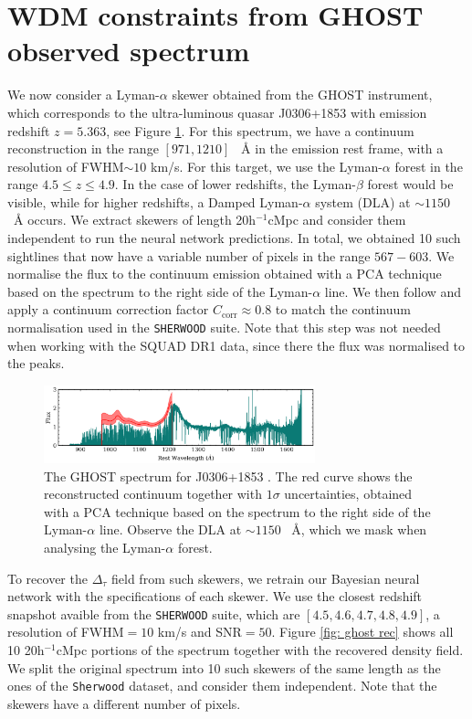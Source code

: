 \section{WDM constraints from GHOST observed spectrum}\label{sec:inference ghost}
We now consider a Lyman-$\alpha$ skewer obtained from the GHOST instrument, which corresponds to the ultra-luminous quasar J0306+1853 \cite{Wang_2015} with emission redshift $z=5.363$, see Figure \ref{fig: ghost spectrum}. For this spectrum, we have a continuum reconstruction in the range $[971, 1210]$ \textup{~\AA} in the emission rest frame, with a resolution of FWHM$\sim 10$ km/s.
For this target, we use the Lyman-$\alpha$ forest in the range $4.5\leq z \leq 4.9$. In the case of lower redshifts, the Lyman-$\beta$ forest would be visible, while for higher redshifts, a Damped Lyman-$\alpha$ system (DLA) at $\sim 1150$ \textup{~\AA} occurs.
We extract skewers of length 20h$^{-1}$cMpc and consider them independent to run the neural network predictions. In total, we obtained 10 such sightlines that now have a variable number of pixels in the range $567-603$. We normalise the flux to the continuum emission obtained with a PCA technique based on the spectrum to the right side of the Lyman-$\alpha$ line. We then follow \cite{Bolton_2016} and apply a continuum correction factor $C_\mathrm{corr}\approx 0.8$ to match the continuum normalisation used in the \texttt{SHERWOOD} suite. Note that this step was not needed when working with the SQUAD DR1 data, since there the flux was normalised to the peaks.


\begin{figure}
    \centering
    \includegraphics[width=0.7\textwidth]{img/ML/ghost_spectrum.png}
    \caption{The GHOST spectrum for J0306+1853 \cite{Wang_2015}. The red curve shows the reconstructed continuum together with $1\sigma$ uncertainties, obtained with a PCA technique based on the spectrum to the right side of the Lyman-$\alpha$ line. Observe the DLA at $\sim 1150$ \textup{~\AA}, which we mask when analysing the Lyman-$\alpha$ forest. }
    \label{fig: ghost spectrum}
\end{figure}

To recover the $\Delta_\tau$ field from such skewers, we retrain our Bayesian neural network with the specifications of each skewer. We use the closest redshift snapshot avaible from the \texttt{SHERWOOD} suite, which are $[4.5, 4.6, 4.7, 4.8, 4.9]$, a resolution of FWHM$=10$ km/s and SNR$=50$. Figure \ref{fig: ghost rec} shows all 10 20h$^{-1}$cMpc portions of the spectrum together with the recovered density field. We split the original spectrum into 10 such skewers of the same length as the ones of the \texttt{Sherwood} dataset, and consider them independent. Note that the skewers have a different number of pixels.


